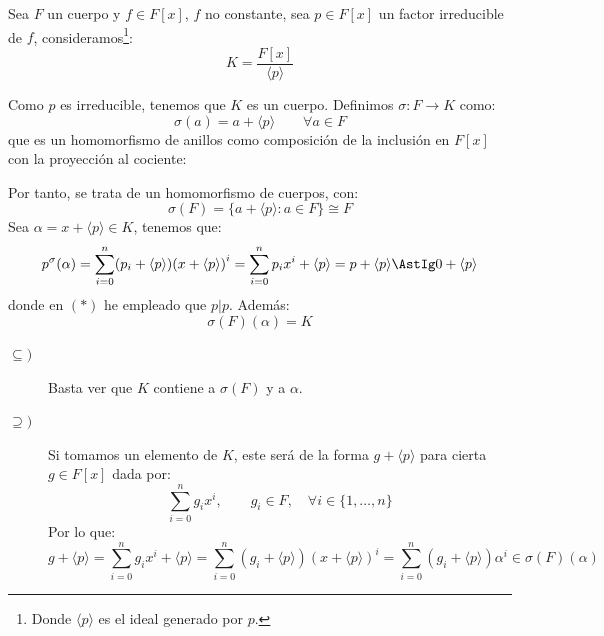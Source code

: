 \begin{ejemplo}\label{ejemplo:cuerpo_descomposicion}
    Sea $F$ un cuerpo y $f\in F[x]$, $f$ no constante, sea $p\in F[x]$ un factor irreducible de $f$, consideramos\footnote{Donde $\langle p \rangle $ es el ideal generado por $p$.}:
    \begin{equation*}
        K = \dfrac{F[x]}{\langle p \rangle }
    \end{equation*}
    
    Como $p$ es irreducible, tenemos que $K$ es un cuerpo. Definimos $\sigma:F\to K$ como:
    \begin{equation*}
        \sigma(a) = a + \langle p \rangle  \qquad \forall a\in F
    \end{equation*}
    que es un homomorfismo de anillos como composición de la inclusión en $F[x]$ con la proyección al cociente:
    \begin{figure}[H]
        \centering
    \end{figure}
    \noindent
    Por tanto, se trata de un homomorfismo de cuerpos, con:
    \begin{equation*}
        \sigma(F) = \{a+\langle p \rangle : a\in F\} \cong F
    \end{equation*}
    Sea $\alpha = x+\langle p \rangle \in K$, tenemos que:
    \begin{equation*}
        p^\sigma(\alpha) = \sum_{i=0}^{n} (p_i + \langle p \rangle){(x+\langle p \rangle )}^{i} = \sum_{i=0}^{n} p_ix^i + \langle p \rangle  = p + \langle p \rangle  \AstIg 0 + \langle p \rangle 
    \end{equation*}
    donde en $(\ast)$ he empleado que $p|p$.
    Además:
    \begin{equation*}
        \sigma(F)(\alpha) = K
    \end{equation*}
    \begin{description}
        \item [$\subseteq )$] Basta ver que $K$ contiene a $\sigma(F)$ y a $\alpha$.
        \item [$\supseteq )$] Si tomamos un elemento de $K$, este será de la forma $g+\langle p \rangle $ para cierta $g\in F[x]$ dada por:
            \begin{equation*}
                \sum_{i=0}^{n}g_ix^i, \qquad g_i \in F, \quad \forall i \in \{1,\ldots,n\}
            \end{equation*}
            Por lo que:
            \begin{equation*}
                g+\langle p \rangle  = \sum_{i=0}^{n}g_ix^i + \langle p \rangle  = \sum_{i=0}^{n}(g_i+\langle p \rangle ){(x+\langle p \rangle )}^{i}
                = \sum_{i=0}^{n}(g_i+\langle p \rangle ){\alpha}^{i} \in \sigma(F)(\alpha)
            \end{equation*}
    \end{description}
\end{ejemplo}


